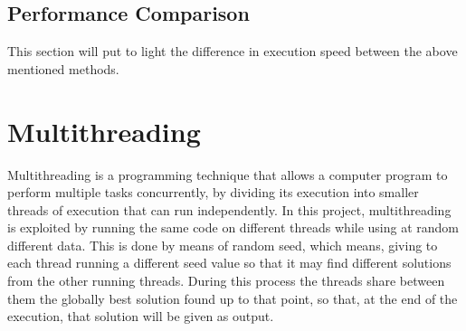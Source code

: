 \subsection{Performance Comparison}

This section will put to light the difference in execution speed between the above mentioned methods.

\section{Multithreading}

Multithreading is a programming technique that allows a computer program to perform multiple tasks concurrently, by dividing its execution into smaller threads of execution that can run independently.
In this project, multithreading is exploited by running the same code on different threads while using at random different data.
This is done by means of random seed, which means, giving to each thread running a different seed value so that it may find different solutions from the other running threads.
During this process the threads share between them the globally best solution found up to that point, so that, at the end of the execution, that solution will be given as output.

